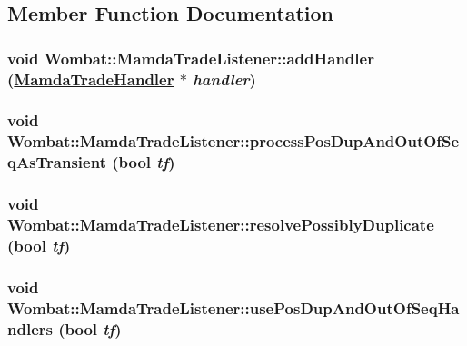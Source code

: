 \subsection{Member Function Documentation}
\hypertarget{classWombat_1_1MamdaTradeListener_cfd3096d997d80ead46a5236f92dcb44}{
\subsubsection[addHandler]{\setlength{\rightskip}{0pt plus 5cm}void Wombat::Mamda\-Trade\-Listener::add\-Handler (\hyperlink{classWombat_1_1MamdaTradeHandler}{Mamda\-Trade\-Handler} $\ast$ {\em handler})}}
\label{classWombat_1_1MamdaTradeListener_cfd3096d997d80ead46a5236f92dcb44}


\hypertarget{classWombat_1_1MamdaTradeListener_bdabe7ac7a04f055f718268aab692d1f}{
\subsubsection[processPosDupAndOutOfSeqAsTransient]{\setlength{\rightskip}{0pt plus 5cm}void Wombat::Mamda\-Trade\-Listener::process\-Pos\-Dup\-And\-Out\-Of\-Seq\-As\-Transient (bool {\em tf})}}
\label{classWombat_1_1MamdaTradeListener_bdabe7ac7a04f055f718268aab692d1f}


\hypertarget{classWombat_1_1MamdaTradeListener_253a81861dc4126c732a740357e790ba}{
\subsubsection[resolvePossiblyDuplicate]{\setlength{\rightskip}{0pt plus 5cm}void Wombat::Mamda\-Trade\-Listener::resolve\-Possibly\-Duplicate (bool {\em tf})}}
\label{classWombat_1_1MamdaTradeListener_253a81861dc4126c732a740357e790ba}


\hypertarget{classWombat_1_1MamdaTradeListener_fca43ba073064a9cbf4b90de9a5d6a30}{
\subsubsection[usePosDupAndOutOfSeqHandlers]{\setlength{\rightskip}{0pt plus 5cm}void Wombat::Mamda\-Trade\-Listener::use\-Pos\-Dup\-And\-Out\-Of\-Seq\-Handlers (bool {\em tf})}}
\label{classWombat_1_1MamdaTradeListener_fca43ba073064a9cbf4b90de9a5d6a30}


